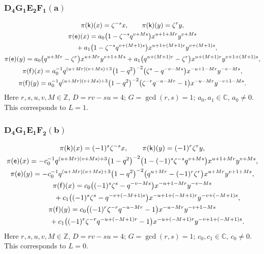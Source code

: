 \documentclass[pdftex]{sigma}
\numberwithin{equation}{section}
\begin{document}
\subsubsection*{$\boldsymbol{D_4G_1E_2F_1(a)}$}
\begin{gather*}
\pi(\mathsf{k})(x)= \zeta^{-s}x ,\qquad\pi(\mathsf{k})(y)=\zeta^ry ,\\
\pi(\mathsf{e})(x)= a_0\big(1-\zeta^{-s}q^{v+Ms}\big)x^{u+1+Mr}y^{v+Ms}\\
\hphantom{\pi(\mathsf{e})(x)=}{}+ a_1\big(1-\zeta^{-s}q^{v+(M+1)s}\big)x^{u+1+(M+1)r}y^{v+(M+1)s} ,\\
\pi(\mathsf{e})(y)= a_0\big(q^{u+Mr}-\zeta^r\big)x^{u+Mr}y^{v+1+Ms}+ a_1\big(q^{u+(M+1)r}-\zeta^r\big)x^{u+(M+1)r}y^{v+1+(M+1)s} ,\\
\pi(\mathsf{f})(x)= a_0^{-1}q^{(u+Mr)(v+Ms)+3}\big(1-q^2\big)^{-2}\big(\zeta^s-q^{-v-Ms}\big)x^{-u+1-Mr}y^{-v-Ms} ,\\
\pi(\mathsf{f})(y)= a_0^{-1}q^{(u+Mr)(v+Ms)+3}\big(1-q^2\big)^{-2}\big(\zeta^{-r}q^{-u-Mr}-1\big)x^{-u-Mr}y^{-v+1-Ms} .
\end{gather*}
Here $r,s,u,v,M\in\mathbb{Z}$, $D=rv-su=4$; $G=\operatorname{gcd}(r,s)=1$; $a_0,a_1\in\mathbb{C}$, $a_0\ne 0$. This corresponds to $L=1$.

\subsubsection*{$\boldsymbol{D_4G_1E_1F_2(b)}$}
\begin{gather*}
\pi(\mathsf{k})(x)= (-1)^s\zeta^{-s}x ,\qquad\pi(\mathsf{k})(y)=(-1)^r\zeta^ry ,\\
\pi(\mathsf{e})(x)= -c_0^{-1}q^{(u+Mr)(v+Ms)+3}\big(1-q^2\big)^{-2}\big(1-(-1)^s\zeta^{-s}q^{v+Ms}\big)x^{u+1+Mr}y^{v+Ms} ,\\
\pi(\mathsf{e})(y)= -c_0^{-1}q^{(u+Mr)(v+Ms)+3}\big(1-q^2\big)^{-2}\big(q^{u+Mr}-(-1)^r\zeta^r\big)x^{u+Mr}y^{v+1+Ms} ,\\
\pi(\mathsf{f})(x)= c_0\big((-1)^s\zeta^s-q^{-v-Ms}\big)x^{-u+1-Mr}y^{-v-Ms}\\
\hphantom{\pi(\mathsf{f})(x)=}{}+ c_1\big((-1)^s\zeta^s-q^{-v+(-M+1)s}\big)x^{-u+1+(-M+1)r}y^{-v+(-M+1)s} ,\\
\pi(\mathsf{f})(y)= c_0\big((-1)^r\zeta^{-r}q^{-u-Mr}-1\big)x^{-u-Mr}y^{-v+1-Ms}\\
\hphantom{\pi(\mathsf{f})(y)=}{} + c_1\big((-1)^r\zeta^{-r}q^{-u+(-M+1)r}-1\big)x^{-u+(-M+1)r}y^{-v+1+(-M+1)s} .
\end{gather*}
Here $r,s,u,v,M\in\mathbb{Z}$, $D=rv-su=4$; $G=\operatorname{gcd}(r,s)=1$; $c_0,c_1\in\mathbb{C}$, $c_0\ne 0$. This corresponds to $L=0$.
\end{document}
